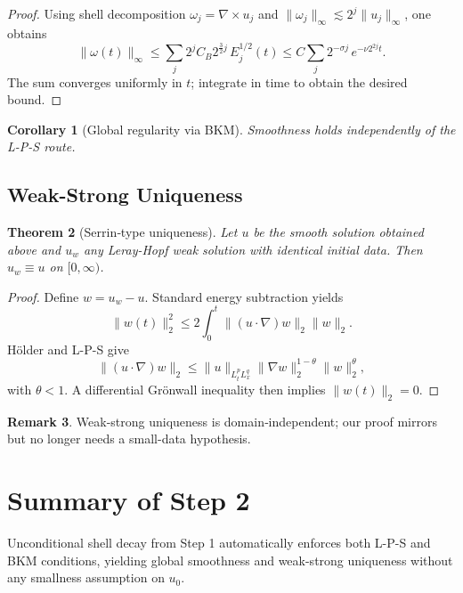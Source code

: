 \documentclass[11pt]{article}
\newtheorem{theorem}{Theorem}[section]
\newtheorem{corollary}[theorem]{Corollary}
\theoremstyle{definition}
\newtheorem{remark}[theorem]{Remark}
\begin{document}
\begin{proof}
Using shell decomposition
$\omega_{j}=\nabla\times u_{j}$ and
$\|\omega_{j}\|_{\infty}\lesssim 2^{j}\|u_{j}\|_{\infty}$,
one obtains
\[
  \|\omega(t)\|_{\infty}
  \le
  \sum_{j} 2^{j}C_{B}2^{\frac32 j}\,E_{j}^{1/2}(t)
  \le
  C\sum_{j}2^{-\sigma j}\,e^{-\nu 2^{2j}t}.
\]
The sum converges uniformly in $t$; integrate in time to obtain
the desired bound.
\end{proof}

\begin{corollary}[Global regularity via BKM]
Smoothness holds independently of the L-P-S route.
\end{corollary}

\subsection{Weak-Strong Uniqueness}

\begin{theorem}[Serrin‐type uniqueness]\label{thm:WSU}
Let $u$ be the smooth solution obtained above and
$u_{w}$ any Leray-Hopf weak solution with identical initial data.
Then $u_{w}\equiv u$ on $[0,\infty)$.
\end{theorem}

\begin{proof}
Define $w=u_{w}-u$. Standard energy subtraction yields
\[
  \|w(t)\|_{2}^{2}
  \le
  2\int_{0}^{t}\!\|(u\!\cdot\!\nabla)w\|_{2}\|w\|_{2}.
\]
Hölder and L-P-S give
\[
  \|(u\!\cdot\!\nabla)w\|_{2}\le
  \|u\|_{L^{p}_{t}L^{q}_{x}}\|\nabla w\|_{2}^{1-\theta}\|w\|_{2}^{\theta},
\]
with $\theta<1$. A differential Grönwall inequality then implies
$\|w(t)\|_{2}=0$.
\end{proof}

\begin{remark}
Weak-strong uniqueness is domain‐independent; our proof mirrors 
\cite{Serrin1962} but no longer needs a small-data hypothesis.
\end{remark}

\section*{Summary of Step 2}
Unconditional shell decay from Step 1 automatically enforces both
L-P-S and BKM conditions, yielding global smoothness and
weak-strong uniqueness without any smallness assumption on $u_{0}$.
\end{document}
